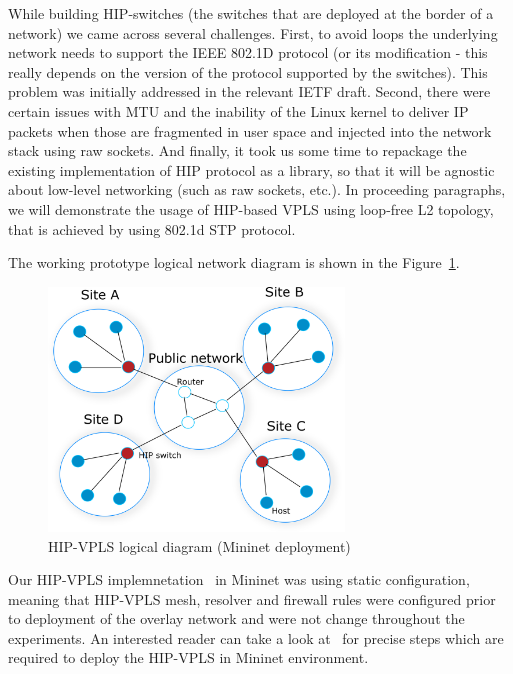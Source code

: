 While building HIP-switches (the switches that are deployed at the border of a network) 
we came across several challenges. First, to avoid loops the underlying network needs to support 
the IEEE 802.1D protocol (or its modification - this really depends on the version of the protocol 
supported by the switches). This problem was initially addressed in the relevant IETF draft. 
Second, there were certain issues with MTU and the inability of the Linux kernel to deliver IP 
packets when those are fragmented in user space and injected into the network stack using raw 
sockets. And finally, it took us some time to repackage the existing implementation of HIP protocol 
as a library, so that it will be agnostic about low-level networking (such as raw sockets, etc.). 
In proceeding paragraphs, we will demonstrate the usage of HIP-based VPLS using loop-free L2 topology,
that is achieved by using 802.1d STP protocol.

The working prototype logical network diagram is shown in the Figure~\ref{fig:mininet}.

\begin{figure}[h!]
    \centering
    \includegraphics[width=0.7\textwidth]{graphics/mininet.png}
    \caption{HIP-VPLS logical diagram (Mininet deployment)}
    \label{fig:mininet}
\end{figure}

Our HIP-VPLS implemnetation~\cite{hip-vpls:mininet} in Mininet was using static configuration, meaning that 
HIP-VPLS mesh, resolver and firewall rules were configured prior to deployment 
of the overlay network and were not change throughout the experiments. An interested reader
can take a look at~\cite{hip-vpls:mininet} for precise steps which are required to 
deploy the HIP-VPLS in Mininet environment.

